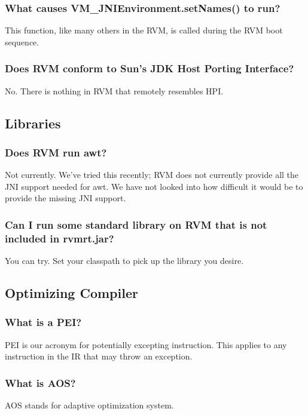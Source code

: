 \subsubsection{What causes VM\_JNIEnvironment.setNames() to run?}
This function, like many others in the RVM, is called during the RVM boot
sequence.

\subsubsection{Does RVM conform to Sun's JDK Host Porting Interface?}

No. There is nothing in RVM that remotely resembles HPI.

\subsection{Libraries}

\subsubsection{Does RVM run awt?}

Not currently.  We've tried this recently; RVM does not currently provide
all the JNI support needed for awt.  We have not looked into how difficult
it would be to provide the missing JNI support.

\subsubsection{Can I run some standard library on RVM that is not included
in rvmrt.jar?}

You can try.  Set your classpath to pick up the library you desire.

\subsection{Optimizing Compiler}

\subsubsection{What is a PEI?}
PEI is our acronym for potentially excepting instruction.  This applies to
any instruction in the IR that may throw an exception.

\subsubsection{What is AOS?}
AOS stands for adaptive optimization system.

